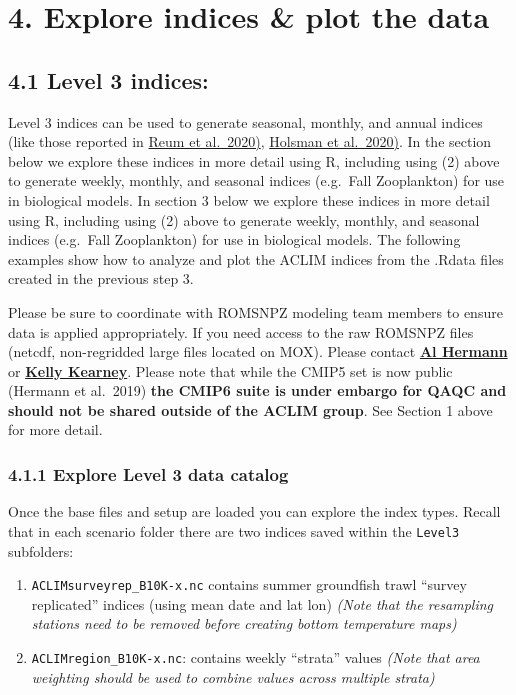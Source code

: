 \documentclass[
]{article}
\providecommand{\tightlist}{%
  \setlength{\itemsep}{0pt}\setlength{\parskip}{0pt}}
\begin{document}
\hypertarget{explore-indices-plot-the-data}{%
\section{4. Explore indices \& plot the
data}\label{explore-indices-plot-the-data}}

\hypertarget{level-3-indices}{%
\subsection{4.1 Level 3 indices:}\label{level-3-indices}}

Level 3 indices can be used to generate seasonal, monthly, and annual
indices (like those reported in
\href{https://www.frontiersin.org/articles/10.3389/fmars.2020.00124/full}{Reum
et al.~2020)},
\href{http://dx.doi.org/10.1038/s41467-020-18300-3}{Holsman et
al.~2020)}. In the section below we explore these indices in more detail
using R, including using (2) above to generate weekly, monthly, and
seasonal indices (e.g.~Fall Zooplankton) for use in biological models.
In section 3 below we explore these indices in more detail using R,
including using (2) above to generate weekly, monthly, and seasonal
indices (e.g.~Fall Zooplankton) for use in biological models. The
following examples show how to analyze and plot the ACLIM indices from
the .Rdata files created in the previous step 3.

Please be sure to coordinate with ROMSNPZ modeling team members to
ensure data is applied appropriately. If you need access to the raw
ROMSNPZ files (netcdf, non-regridded large files located on MOX). Please
contact \href{albert.j.hermann@noaa.gov}{\textbf{Al Hermann}} or
\href{kelly.kearney@noaa.gov}{\textbf{Kelly Kearney}}. Please note that
while the CMIP5 set is now public (Hermann et al.~2019) \textbf{the
CMIP6 suite is under embargo for QAQC and should not be shared outside
of the ACLIM group}. See Section 1 above for more detail.

\hypertarget{explore-level-3-data-catalog}{%
\subsubsection{4.1.1 Explore Level 3 data
catalog}\label{explore-level-3-data-catalog}}

Once the base files and setup are loaded you can explore the index
types. Recall that in each scenario folder there are two indices saved
within the \texttt{Level3} subfolders:

\begin{enumerate}
\def\labelenumi{\arabic{enumi})}
\tightlist
\item
  \texttt{ACLIMsurveyrep\_B10K-x.nc} contains summer groundfish trawl
  ``survey replicated'' indices (using mean date and lat lon)
  \emph{(Note that the resampling stations need to be removed before
  creating bottom temperature maps)}\\
\item
  \texttt{ACLIMregion\_B10K-x.nc}: contains weekly ``strata'' values
  \emph{(Note that area weighting should be used to combine values
  across multiple strata)}
\end{enumerate}
\end{document}
